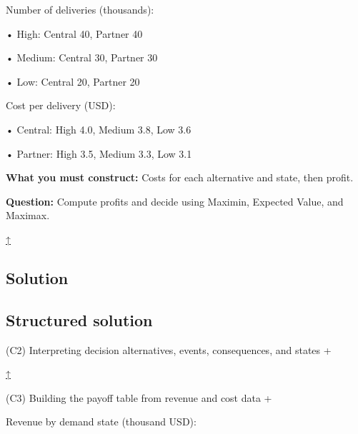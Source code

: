 \documentclass[11pt]{article}
\begin{document}
	
	
	
	
	Number of deliveries (thousands):
	
	
	
	• High: Central 40, Partner 40
	
	
	
	• Medium: Central 30, Partner 30
	
	
	
	• Low: Central 20, Partner 20
	
	
	
	
	
	Cost per delivery (USD):
	
	
	
	• Central: High 4.0, Medium 3.8, Low 3.6
	
	
	
	• Partner: High 3.5, Medium 3.3, Low 3.1
	
	
	
	
	
	
	\textbf{What you must construct:} Costs for each alternative and state, then profit.
	
	
	
	
	
	
	\textbf{Question:} Compute profits and decide using Maximin, Expected Value, and Maximax.
	
	\hyperref[problem5-criteria]{↑}
	
	\subsection*{Solution}
	
	\label{problem5-solution}\label{problem5-criteria}
	
	\subsection*{Structured solution}
	
	
	
	
	
	(C2) Interpreting decision alternatives, events, consequences, and states
	+
	
	
	
	
	
	\hyperref[problem5-criteria]{↑}
	
	
	
	
	(C3) Building the payoff table from revenue and cost data
	+
	
	
	Revenue by demand state (thousand USD):
	
\end{document}
